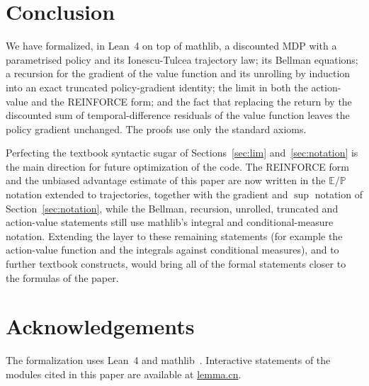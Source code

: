 \documentclass[11pt,a4paper]{article}
\newcommand{\E}{\mathbb{E}}
\newcommand{\Prb}{\mathbb{P}}
\begin{document}
\section{Conclusion}
\label{sec:conclusion}

We have formalized, in Lean~4 on top of mathlib, a discounted MDP with a parametrised policy and its Ionescu-Tulcea trajectory law; its Bellman equations; a recursion for the gradient of the value function and its unrolling by induction into an exact truncated policy-gradient identity; the limit in both the action-value and the REINFORCE form; and the fact that replacing the return by the discounted sum of temporal-difference residuals of the value function leaves the policy gradient unchanged.
The proofs use only the standard axioms.

Perfecting the textbook syntactic sugar of Sections~\ref{sec:lim} and~\ref{sec:notation} is the main direction for future optimization of the code.
The REINFORCE form and the unbiased advantage estimate of this paper are now written in the $\E$/$\Prb$ notation extended to trajectories, together with the gradient and $\sup$ notation of Section~\ref{sec:notation}, while the Bellman, recursion, unrolled, truncated and action-value statements still use mathlib's integral and conditional-measure notation.
Extending the layer to these remaining statements (for example the action-value function and the integrals against conditional measures), and to further textbook constructs, would bring all of the formal statements closer to the formulas of the paper.

\section*{Acknowledgements}

The formalization uses Lean~4 and mathlib~\cite{moura2021lean4,mathlib2020}.
Interactive statements of the modules cited in this paper are available at \href{http://www.lemma.cn/}{lemma.cn}.

\begingroup
\sloppy


\endgroup
\end{document}
